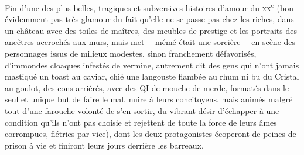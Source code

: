 Fin d’une des plus belles, tragiques et subversives histoires d’amour du \textsc{xx}\textsuperscript{e} (bon évidemment pas très glamour du fait qu’elle ne se passe pas chez les riches, dans un château avec des toiles de maîtres, des meubles de prestige et les portraits des ancêtres accrochés aux murs, mais met~-- mémé était une sorcière~-- en scène des personnages issus de milieux modestes, sinon franchement défavorisés, d’immondes cloaques infestés de vermine, autrement dit des gens qui n’ont jamais mastiqué un toast au caviar, chié une langouste flambée au rhum ni bu du Cristal au goulot, des cons arriérés, avec des QI de mouche de merde, formatés dans le seul et unique but de faire le mal, nuire à leurs concitoyens, mais animés malgré tout d’une farouche volonté de s’en sortir, du vibrant désir d’échapper à une condition qu’ils n’ont pas choisie et rejettent de toute la force de leurs âmes corrompues, flétries par vice), dont les deux protagonistes écoperont de peines de prison à vie et finiront leurs jours derrière les barreaux.

